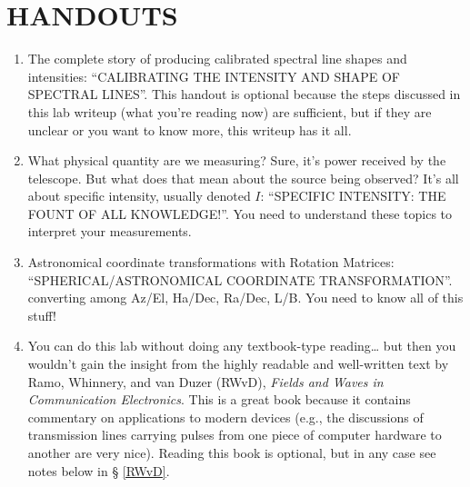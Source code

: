 \documentclass[12pt,preprint]{aastex}
\begin{document}
\section{HANDOUTS} \label{handouts}
\begin{enumerate}

\item The complete story of producing calibrated spectral line shapes
  and intensities: ``CALIBRATING THE INTENSITY AND SHAPE OF SPECTRAL
  LINES''. This handout is optional because the steps discussed in
  this lab writeup (what you're reading now) are sufficient, but
  if they are unclear or you want to know more, this writeup has it all.

\item What physical quantity are we measuring? Sure, it's power received
  by the telescope. But what does that mean about the source being
  observed? It's all about specific intensity, usually denoted $I$:
  ``SPECIFIC INTENSITY: THE FOUNT OF ALL KNOWLEDGE!''. 
  You need to understand these topics to interpret your measurements.

\item Astronomical coordinate transformations with Rotation Matrices:
  ``SPHERICAL/ASTRONOMICAL COORDINATE
  TRANSFORMATION''. converting among Az/El, Ha/Dec, Ra/Dec, L/B. 
    You need to know all of this stuff!

\item You can do this lab without doing any textbook-type reading\dots
  but then you wouldn't gain the insight from the highly readable and
  well-written text by Ramo, Whinnery, and van Duzer (RWvD), {\it Fields
    and Waves in Communication Electronics}. This is a great book
  because it contains commentary on applications to modern devices
  (e.g., the discussions of transmission lines carrying pulses from one
  piece of computer hardware to another are very nice).  Reading this
  book is optional, but in any case see notes below in \S
  \ref{RWvD}.

\end{enumerate}
\end{document}
